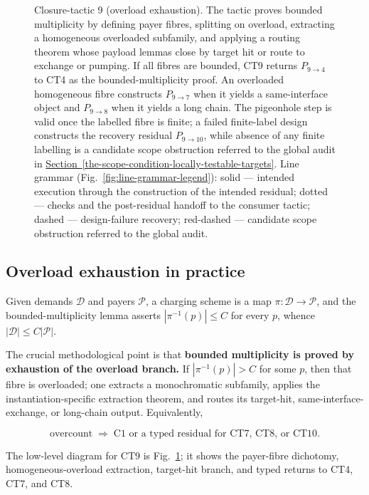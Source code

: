 \documentclass[
  11pt,
]{article}
\theoremstyle{definition}
\newcommand{\secref}[1]{\hyperref[#1]{Section~\ref*{#1}}}
\begin{document}
\begin{figure}[p]
\caption[Closure-tactic 9: overload exhaustion]{Closure-tactic 9 (overload exhaustion).  The tactic proves bounded multiplicity by defining payer fibres, splitting on overload, extracting a homogeneous overloaded subfamily, and applying a routing theorem whose payload lemmas close by target hit or route to exchange or pumping.  If all fibres are bounded, CT9 returns \(P_{9\to4}\) to CT4 as the bounded-multiplicity proof.  An overloaded homogeneous fibre constructs \(P_{9\to7}\) when it yields a same-interface object and \(P_{9\to8}\) when it yields a long chain.  The pigeonhole step is valid once the labelled fibre is finite; a failed finite-label design constructs the recovery residual \(P_{9\to10}\), while absence of any finite labelling is a candidate scope obstruction referred to the global audit in \secref{the-scope-condition-locally-testable-targets}.  Line grammar (Fig.~\ref{fig:line-grammar-legend}): solid --- intended execution through the construction of the intended residual; dotted --- checks and the post-residual handoff to the consumer tactic; dashed --- design-failure recovery; red-dashed --- candidate scope obstruction referred to the global audit.}
\label{fig:ct9-overload-exhaustion}
\end{figure}
\FloatBarrier

\subsection*{Overload exhaustion in practice}

Given demands \(\mathcal D\) and payers \(\mathcal P\), a charging
scheme is a map \(\pi:\mathcal D\to\mathcal P\), and the
bounded-multiplicity lemma asserts \(|\pi^{-1}(p)|\le C\) for every
\(p\), whence \(|\mathcal D|\le C|\mathcal P|\).

The crucial methodological point is that \textbf{bounded multiplicity is
proved by exhaustion of the overload branch.} If \(|\pi^{-1}(p)| > C\)
for some \(p\), then that fibre is overloaded; one extracts a
monochromatic subfamily, applies the instantiation-specific extraction
theorem, and routes its target-hit, same-interface-exchange, or long-chain
output. Equivalently,

\[
\text{overcount} \;\Rightarrow\;
\text{C1 or a typed residual for CT7, CT8, or CT10}.
\]

The low-level diagram for CT9 is Fig.~\ref{fig:ct9-overload-exhaustion};
it shows the payer-fibre dichotomy, homogeneous-overload extraction,
target-hit branch, and typed returns to CT4, CT7, and CT8.
\end{document}
